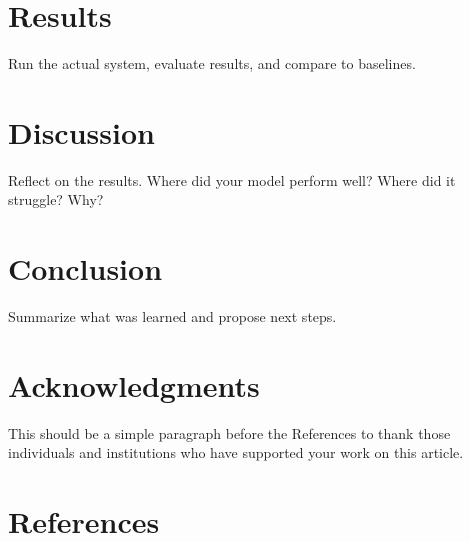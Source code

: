 \documentclass[
  10pt,
  letterpaper,
  lettersize,
  journal]{IEEEtran}
\begin{document}
\section{Results}\label{results}

Run the actual system, evaluate results, and compare to baselines.

\section{Discussion}\label{discussion}

Reflect on the results. Where did your model perform well? Where did it
struggle? Why?

\section{Conclusion}\label{conclusion}

Summarize what was learned and propose next steps.

\section{Acknowledgments}\label{acknowledgments}

This should be a simple paragraph before the References to thank those
individuals and institutions who have supported your work on this
article.

\section*{References}\label{references}
\end{document}
